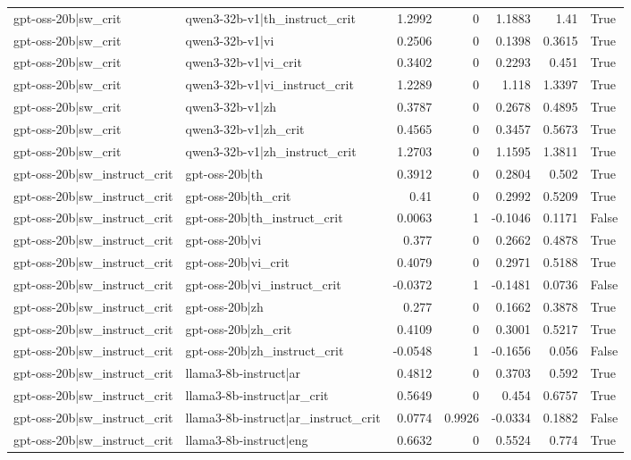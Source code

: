 \begin{table}
\begin{tabular}{l l r r r r l}
gpt-oss-20b|sw_crit & qwen3-32b-v1|th_instruct_crit & 1.2992 & 0 & 1.1883 & 1.41 & True \\
gpt-oss-20b|sw_crit & qwen3-32b-v1|vi & 0.2506 & 0 & 0.1398 & 0.3615 & True \\
gpt-oss-20b|sw_crit & qwen3-32b-v1|vi_crit & 0.3402 & 0 & 0.2293 & 0.451 & True \\
gpt-oss-20b|sw_crit & qwen3-32b-v1|vi_instruct_crit & 1.2289 & 0 & 1.118 & 1.3397 & True \\
gpt-oss-20b|sw_crit & qwen3-32b-v1|zh & 0.3787 & 0 & 0.2678 & 0.4895 & True \\
gpt-oss-20b|sw_crit & qwen3-32b-v1|zh_crit & 0.4565 & 0 & 0.3457 & 0.5673 & True \\
gpt-oss-20b|sw_crit & qwen3-32b-v1|zh_instruct_crit & 1.2703 & 0 & 1.1595 & 1.3811 & True \\
gpt-oss-20b|sw_instruct_crit & gpt-oss-20b|th & 0.3912 & 0 & 0.2804 & 0.502 & True \\
gpt-oss-20b|sw_instruct_crit & gpt-oss-20b|th_crit & 0.41 & 0 & 0.2992 & 0.5209 & True \\
gpt-oss-20b|sw_instruct_crit & gpt-oss-20b|th_instruct_crit & 0.0063 & 1 & -0.1046 & 0.1171 & False \\
gpt-oss-20b|sw_instruct_crit & gpt-oss-20b|vi & 0.377 & 0 & 0.2662 & 0.4878 & True \\
gpt-oss-20b|sw_instruct_crit & gpt-oss-20b|vi_crit & 0.4079 & 0 & 0.2971 & 0.5188 & True \\
gpt-oss-20b|sw_instruct_crit & gpt-oss-20b|vi_instruct_crit & -0.0372 & 1 & -0.1481 & 0.0736 & False \\
gpt-oss-20b|sw_instruct_crit & gpt-oss-20b|zh & 0.277 & 0 & 0.1662 & 0.3878 & True \\
gpt-oss-20b|sw_instruct_crit & gpt-oss-20b|zh_crit & 0.4109 & 0 & 0.3001 & 0.5217 & True \\
gpt-oss-20b|sw_instruct_crit & gpt-oss-20b|zh_instruct_crit & -0.0548 & 1 & -0.1656 & 0.056 & False \\
gpt-oss-20b|sw_instruct_crit & llama3-8b-instruct|ar & 0.4812 & 0 & 0.3703 & 0.592 & True \\
gpt-oss-20b|sw_instruct_crit & llama3-8b-instruct|ar_crit & 0.5649 & 0 & 0.454 & 0.6757 & True \\
gpt-oss-20b|sw_instruct_crit & llama3-8b-instruct|ar_instruct_crit & 0.0774 & 0.9926 & -0.0334 & 0.1882 & False \\
gpt-oss-20b|sw_instruct_crit & llama3-8b-instruct|eng & 0.6632 & 0 & 0.5524 & 0.774 & True \\

\end{tabular}
\end{table}
